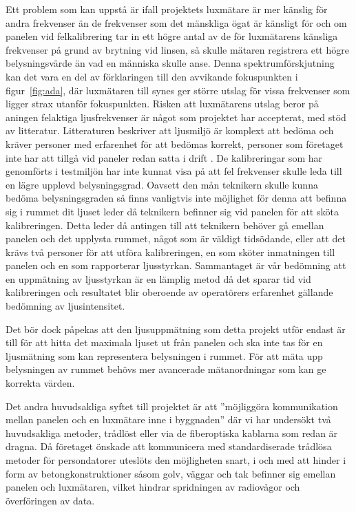         Ett problem som kan uppstå är ifall projektets luxmätare är mer känslig för andra frekvenser än de frekvenser som det mänskliga ögat är känsligt för och om panelen vid felkalibrering tar in ett högre antal av de för luxmätarens känsliga frekvenser på grund av brytning vid linsen, så skulle mätaren registrera ett högre belysningsvärde än vad en människa skulle anse. Denna spektrumförskjutning kan det vara en del av förklaringen till den avvikande fokuspunkten i figur~\ref{fig:ada}, där luxmätaren till synes ger större utslag för vissa frekvenser som ligger strax utanför fokuspunkten. Risken att luxmätarens utslag beror på aningen felaktiga ljusfrekvenser är något som projektet har accepterat, med stöd av litteratur. Litteraturen beskriver att ljusmiljö är komplext att bedöma och kräver personer med erfarenhet för att bedömas korrekt, personer som företaget inte har att tillgå vid paneler redan satta i drift \cite[s.~278]{aot}. De kalibreringar som har genomförts i testmiljön har inte kunnat visa på att fel frekvenser skulle leda till en lägre upplevd belysningsgrad. Oavsett den mån teknikern skulle kunna bedöma belysningsgraden så finns vanligtvis inte möjlighet för denna att befinna sig i rummet dit ljuset leder då teknikern befinner sig vid panelen för att sköta kalibreringen. Detta leder då antingen till att teknikern behöver gå emellan panelen och det upplysta rummet, något som är väldigt tidsödande, eller att det krävs två personer för att utföra kalibreringen, en som sköter inmatningen till panelen och en som rapporterar ljusstyrkan. Sammantaget är vår bedömning att en uppmätning av ljusstyrkan är en lämplig metod då det sparar tid vid kalibreringen och resultatet blir oberoende av operatörers erfarenhet gällande bedömning av ljusintensitet. \bigskip

        Det bör dock påpekas att den ljusuppmätning som detta projekt utför endast är till för att hitta det maximala ljuset ut från panelen och ska inte tas för en ljusmätning som kan representera belysningen i rummet. För att mäta upp belysningen av rummet behövs mer avancerade mätanordningar som kan ge korrekta värden.\bigskip

        Det andra huvudsakliga syftet till projektet är att ''möjliggöra kommunikation mellan panelen och en luxmätare inne i byggnaden'' där vi har undersökt två huvudsakliga metoder, trådlöst eller via de fiberoptiska kablarna som redan är dragna. Då företaget önskade att kommunicera med standardiserade trådlösa metoder för persondatorer uteslöts den möjligheten snart, i och med att hinder i form av betongkonstruktioner såsom golv, väggar och tak befinner sig emellan panelen och luxmätaren, vilket hindrar spridningen av radiovågor och överföringen av data.\bigskip

